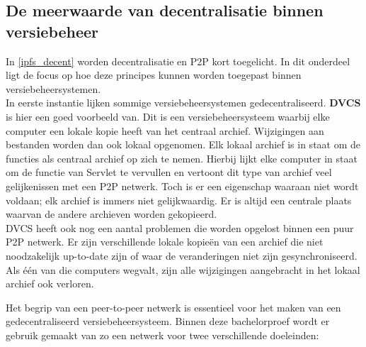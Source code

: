 \subsection{De meerwaarde van decentralisatie binnen versiebeheer}
In \ref{ipfs_decent} worden decentralisatie en P2P kort toegelicht. In dit onderdeel ligt de focus op hoe deze principes kunnen worden toegepast binnen versiebeheersystemen.\\

In eerste instantie lijken sommige versiebeheersystemen gedecentraliseerd. \textbf{DVCS} is hier een goed voorbeeld van. Dit is een versiebeheersysteem waarbij elke computer een lokale kopie heeft van het centraal archief. Wijzigingen aan bestanden worden dan ook lokaal opgenomen. Elk lokaal archief is in staat om de functies als centraal archief op zich te nemen. Hierbij lijkt elke computer in staat om de functie van Servlet te vervullen en vertoont dit type van archief veel gelijkenissen met een P2P netwerk. Toch is er een eigenschap waaraan niet wordt voldaan; elk archief is immers niet gelijkwaardig. Er is altijd een centrale plaats waarvan de andere archieven worden gekopieerd.\\

DVCS heeft ook nog een aantal problemen die worden opgelost binnen een puur P2P netwerk. Er zijn verschillende lokale kopieën van een archief die niet noodzakelijk up-to-date zijn of waar de veranderingen niet zijn gesynchroniseerd. Als één van die computers wegvalt, zijn alle wijzigingen aangebracht in het lokaal archief ook verloren. 

Het begrip van een peer-to-peer netwerk is essentieel voor het maken van een gedecentraliseerd versiebeheersysteem. Binnen deze bachelorproef wordt er gebruik gemaakt van zo een netwerk voor twee verschillende doeleinden:


